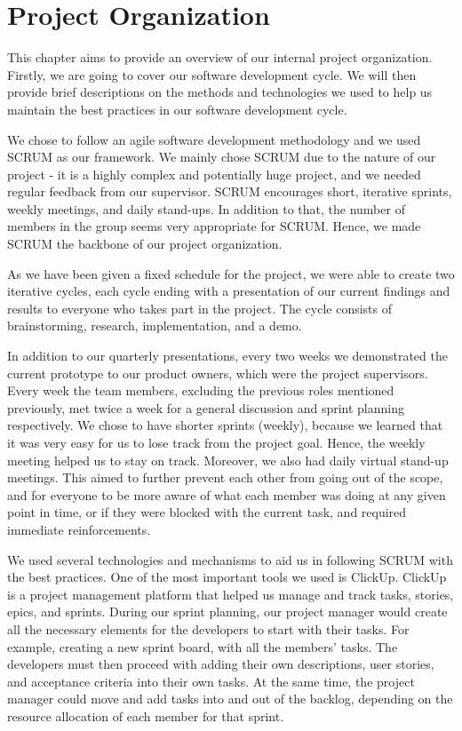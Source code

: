 \chapter{Project Organization}

This chapter aims to provide an overview of our internal project organization. Firstly, we are going to cover our software development cycle. We will then provide brief descriptions on the methods and technologies we used to help us maintain the best practices in our software development cycle.

We chose to follow an agile software development methodology and we used SCRUM as our framework. We mainly chose SCRUM due to the nature of our project - it is a highly complex and potentially huge project, and we needed regular feedback from our supervisor. SCRUM encourages short, iterative sprints, weekly meetings, and daily stand-ups. In addition to that, the number of members in the group seems very appropriate for SCRUM. Hence, we made SCRUM the backbone of our project organization.

As we have been given a fixed schedule for the project, we were able to create two iterative cycles, each cycle ending with a presentation of our current findings and results to everyone who takes part in the project. The cycle consists of brainstorming, research, implementation, and a demo.

In addition to our quarterly presentations, every two weeks we demonstrated the current prototype to our product owners, which were the project supervisors. Every week the team members, excluding the previous roles mentioned previously, met twice a week for a general discussion and sprint planning respectively. We chose to have shorter sprints (weekly), because we learned that it was very easy for us to lose track from the project goal. Hence, the weekly meeting helped us to stay on track. Moreover, we also had daily virtual stand-up meetings. This aimed to further prevent each other from going out of the scope, and for everyone to be more aware of what each member was doing at any given point in time, or if they were blocked with the current task, and required immediate reinforcements.

We used several technologies and mechanisms to aid us in following SCRUM with the best practices. One of the most important tools we used is ClickUp. ClickUp is a project management platform that helped us manage and track tasks, stories, epics, and sprints. During our sprint planning, our project manager would create all the necessary elements for the developers to start with their tasks. For example, creating a new sprint board, with all the members' tasks. The developers must then proceed with adding their own descriptions, user stories, and acceptance criteria into their own tasks. At the same time, the project manager could move and add tasks into and out of the backlog, depending on the resource allocation of each member for that sprint.

